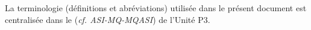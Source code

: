 \begin{pagesService}
\begin{terminologie}
		La terminologie (définitions et abréviations) utilisée dans le présent document est centralisée dans le \MQ{} \ASICourt{} (\emph{cf. ASI-MQ-MQASI}) de l'Unité P3.

		\begin{listeDAbreviations}
			\uneAbreviation{\asiCourt}{\asi}
			\uneAbreviation{\DSECourt}{\DSE}
			\uneAbreviation{\DGQDEUXCourt}{\DGQDEUX}
			\uneAbreviation{\INSACourt}{\INSA}
			\uneAbreviation{\MQCourt}{\MQ}
			\uneAbreviation{\PICCourt}{\PIC}
			\uneAbreviation{\PTVCourt}{\PTV}
			
		\end{listeDAbreviations}
	\end{terminologie}
	
	
\end{pagesService}
